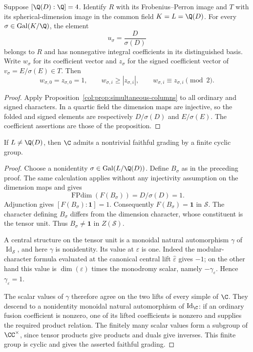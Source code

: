 \begin{proposition}\label{col:prop:positive-Galois-columns}
Suppose $[\Q(D):\Q]=4$. Identify $R$ with
its Frobenius--Perron image and $T$ with its spherical-dimension
image in the common field $K=L=\Q(D)$. For every
$\sigma\in\operatorname{Gal}(K/\Q)$, the element
\[
 u_\sigma=\frac{D}{\sigma(D)}
\]
belongs to $R$ and has nonnegative integral coefficients in its
distinguished basis. Write $w_\sigma$ for its coefficient vector and
$z_\sigma$ for the signed coefficient vector of
$v_\sigma=E/\sigma(E)\in T$. Then
\[
 w_{\sigma,0}=z_{\sigma,0}=1,\qquad
 w_{\sigma,i}\ge |z_{\sigma,i}|,\qquad
 w_{\sigma,i}\equiv z_{\sigma,i}\pmod2.
\]
\end{proposition}
\begin{proof}
Apply Proposition~\ref{col:prop:simultaneous-columns} to all ordinary
and signed characters. In a quartic field the dimension maps are
injective, so the folded and signed elements are respectively
$D/\sigma(D)$ and $E/\sigma(E)$. The coefficient assertions are
those of the proposition.
\end{proof}



\begin{proposition}\label{col:prop:dimension-field-grading}
If $L\ne\Q(D)$, then $\C$ admits a nontrivial
faithful grading by a finite cyclic group.
\end{proposition}
\begin{proof}
Choose a nonidentity $\sigma\in\operatorname{Gal}(L/\Q(D))$.
Define $B_\sigma$ as in the preceding proof. The same
calculation applies without any injectivity assumption on the
dimension maps and gives
\[
 \operatorname{FPdim}(F(B_\sigma))=D/\sigma(D)=1.
\]
Adjunction gives $[F(B_\sigma):\mathbf1]=1$. Consequently
$F(B_\sigma)=\mathbf1$ in $\mathcal S$. The character defining
$B_\sigma$ differs from the dimension character, whose constituent
is the tensor unit. Thus $B_\sigma\ne\mathbf1$ in $Z(\mathcal S)$.

A central structure on the tensor unit is a monoidal natural
automorphism $\gamma$ of $\operatorname{Id}_{\mathcal S}$, and here
$\gamma$ is nonidentity. Its value at $\varepsilon$ is one.
Indeed the modular-character formula evaluated at the canonical
central lift $\widehat\varepsilon$ gives $-1$; on the other hand
this value is $\dim(\varepsilon)$ times the monodromy scalar,
namely $-\gamma_\varepsilon$. Hence
$\gamma_\varepsilon=1$.

The scalar values of $\gamma$ therefore agree on the two lifts of
every simple of $\C$. They descend to a nonidentity
monoidal natural automorphism of $\operatorname{Id}_{\C}$:
if an ordinary fusion coefficient is nonzero, one of its lifted
coefficients is nonzero and supplies the required product relation.
The finitely many scalar values form a subgroup of $\CC^\times$,
since tensor products give products and duals give inverses. This
finite group is cyclic and gives the asserted faithful grading.
\end{proof}

